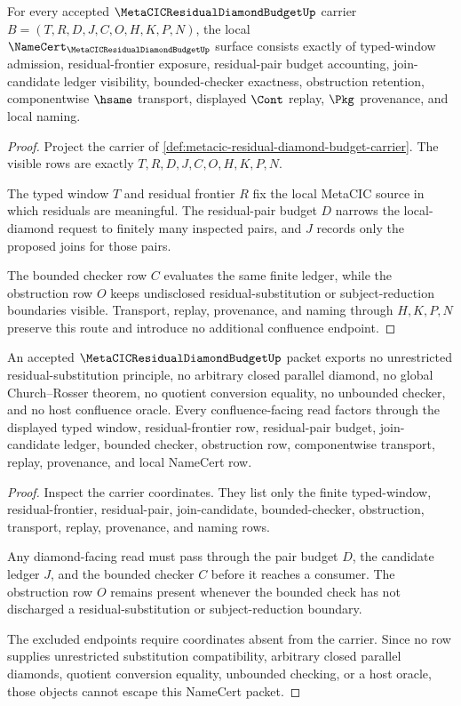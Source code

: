\begin{theorem}
\label{thm:metacic-residual-diamond-budget-obligations}
For every accepted $\MetaCICResidualDiamondBudgetUp$ carrier $B=(T,R,D,J,C,O,H,K,P,N)$, the local $\NameCert_{\MetaCICResidualDiamondBudgetUp}$ surface consists exactly of typed-window admission, residual-frontier exposure, residual-pair budget accounting, join-candidate ledger visibility, bounded-checker exactness, obstruction retention, componentwise $\hsame$ transport, displayed $\Cont$ replay, $\Pkg$ provenance, and local naming.
\end{theorem}
\begin{proof}
Project the carrier of \autoref{def:metacic-residual-diamond-budget-carrier}. The visible rows are exactly $T,R,D,J,C,O,H,K,P,N$.

The typed window $T$ and residual frontier $R$ fix the local MetaCIC source in which residuals are meaningful. The residual-pair budget $D$ narrows the local-diamond request to finitely many inspected pairs, and $J$ records only the proposed joins for those pairs.

The bounded checker row $C$ evaluates the same finite ledger, while the obstruction row $O$ keeps undisclosed residual-substitution or subject-reduction boundaries visible. Transport, replay, provenance, and naming through $H,K,P,N$ preserve this route and introduce no additional confluence endpoint.
\end{proof}

\begin{theorem}
\label{thm:metacic-residual-diamond-budget-nonescape}
An accepted $\MetaCICResidualDiamondBudgetUp$ packet exports no unrestricted residual-substitution principle, no arbitrary closed parallel diamond, no global Church--Rosser theorem, no quotient conversion equality, no unbounded checker, and no host confluence oracle. Every confluence-facing read factors through the displayed typed window, residual-frontier row, residual-pair budget, join-candidate ledger, bounded checker, obstruction row, componentwise transport, replay, provenance, and local NameCert row.
\end{theorem}
\begin{proof}
Inspect the carrier coordinates. They list only the finite typed-window, residual-frontier, residual-pair, join-candidate, bounded-checker, obstruction, transport, replay, provenance, and naming rows.

Any diamond-facing read must pass through the pair budget $D$, the candidate ledger $J$, and the bounded checker $C$ before it reaches a consumer. The obstruction row $O$ remains present whenever the bounded check has not discharged a residual-substitution or subject-reduction boundary.

The excluded endpoints require coordinates absent from the carrier. Since no row supplies unrestricted substitution compatibility, arbitrary closed parallel diamonds, quotient conversion equality, unbounded checking, or a host oracle, those objects cannot escape this NameCert packet.
\end{proof}


